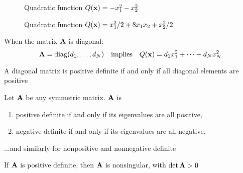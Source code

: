 \begin{frame}

     \vspace{2em}
    \begin{figure}
   \begin{center}
    \caption{\label{f:qform_nd} Quadratic function $Q({\mathbf x}) = -x_1^2 - x_2^2$ }
   \end{center}
    \end{figure}
    
\end{frame}

\begin{frame}

     \vspace{2em}
    \begin{figure}
   \begin{center}
    \caption{\label{f:qform_indef} Quadratic function $Q({\mathbf x}) = x_1^2/2 +
        8 x_1 x_2 + x_2^2/2$ }
   \end{center}
    \end{figure}
    
\end{frame}

\begin{frame}  

   \vspace{2em}
   When the matrix $\mathbf A$ is diagonal: 
    \begin{equation*}
        \mathbf A = \operatorname{diag}(d_1, \ldots, d_N)
        \quad \text{implies} \quad
        Q({\mathbf x}) = d_1 x_1^2 + \cdots + d_N x_N^2  
    \end{equation*}
    
    
    \vspace{.7em}
    A diagonal matrix is positive definite if and only if all diagonal elements are positive 
    
\end{frame}

\begin{frame}

    \vspace{2em}
    \Fact{\eqref{ET-fa:eigdef}}
    Let $\mathbf A$ be any symmetric matrix.  $\mathbf A$ is 
    \begin{enumerate}
        \item positive definite if and only if its eigenvalues are all positive,
        \item negative definite if and only if its eigenvalues are all negative,
    \end{enumerate}
    ...and similarly for nonpositive and nonnegative definite
    
    \vspace{.7em}
    \Fact{\eqref{ET-fa:ipde}}
        If $\mathbf A$ is positive definite, then $\mathbf A$ is nonsingular, with $\det \mathbf A > 0$

\end{frame}

